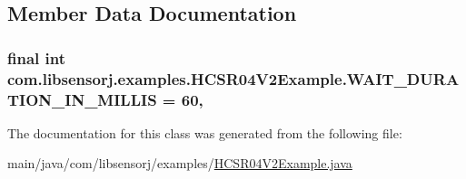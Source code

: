 \subsection{Member Data Documentation}
\hypertarget{classcom_1_1libsensorj_1_1examples_1_1HCSR04V2Example_a842da4140bea50803113aae3d885604d}{}
\subsubsection[{W\+A\+I\+T\+\_\+\+D\+U\+R\+A\+T\+I\+O\+N\+\_\+\+I\+N\+\_\+\+M\+I\+L\+L\+I\+S}]{\setlength{\rightskip}{0pt plus 5cm}final int com.\+libsensorj.\+examples.\+H\+C\+S\+R04\+V2\+Example.\+W\+A\+I\+T\+\_\+\+D\+U\+R\+A\+T\+I\+O\+N\+\_\+\+I\+N\+\_\+\+M\+I\+L\+L\+I\+S = 60\hspace{0.3cm}{\ttfamily [static]}, {\ttfamily [private]}}\label{classcom_1_1libsensorj_1_1examples_1_1HCSR04V2Example_a842da4140bea50803113aae3d885604d}


The documentation for this class was generated from the following file\+:\begin{DoxyCompactItemize}
\item 
main/java/com/libsensorj/examples/\hyperlink{HCSR04V2Example_8java}{H\+C\+S\+R04\+V2\+Example.\+java}\end{DoxyCompactItemize}
